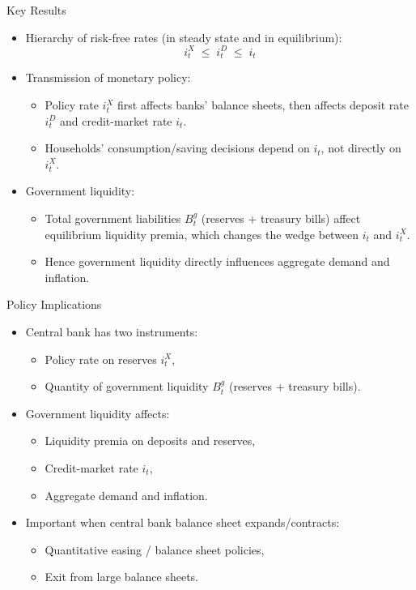 \documentclass[11pt,aspectratio=169]{beamer}
\begin{document}
\begin{frame}{Key Results}
  \begin{itemize}
    \item Hierarchy of risk-free rates (in steady state and in equilibrium):
    $$i_t^X \;\le\; i_t^D \;\le\; i_t$$
    \item Transmission of monetary policy:
    \begin{itemize}
      \item Policy rate $i_t^X$ first affects banks' balance sheets, then affects deposit rate $i_t^D$ and credit-market rate $i_t$.
      \item Households' consumption/saving decisions depend on $i_t$, not directly on $i_t^X$.
    \end{itemize}
    \medskip
    \item Government liquidity:
    \begin{itemize}
      \item Total government liabilities $B_t^g$ (reserves + treasury bills) affect equilibrium liquidity premia, which changes the wedge between $i_t$ and $i_t^X$.
      \item Hence government liquidity directly influences aggregate demand and inflation.
    \end{itemize}
  \end{itemize}
\end{frame}

\begin{frame}{Policy Implications}
  \begin{itemize}
    \item Central bank has two instruments:
    \begin{itemize}
      \item Policy rate on reserves $i_t^X$,
      \item Quantity of government liquidity $B_t^g$ (reserves + treasury bills).
    \end{itemize}
    \medskip
    \item Government liquidity affects:
    \begin{itemize}
      \item Liquidity premia on deposits and reserves,
      \item Credit-market rate $i_t$,
      \item Aggregate demand and inflation.
    \end{itemize}
    \medskip
    \item Important when central bank balance sheet expands/contracts:
    \begin{itemize}
      \item Quantitative easing / balance sheet policies,
      \item Exit from large balance sheets.
    \end{itemize}
  \end{itemize}
\end{frame}
\end{document}
